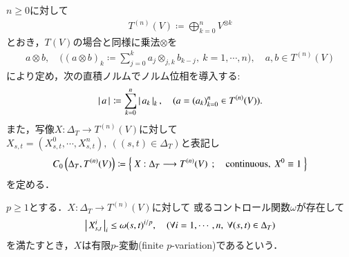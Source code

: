 	$n \geq 0$に対して
	\begin{align}
		T^{(n)}(V) \coloneqq \bigoplus_{k=0}^{n} V^{\otimes k}
	\end{align}
	とおき，$T(V)$の場合と同様に乗法$\otimes$を
	\begin{align}
		a \otimes b,\quad
		\Biggl((a \otimes b)_k \coloneqq \sum_{j=0}^{k} a_j \otimes_{j,k} b_{k-j},\ k=1,\cdots,n \Biggr),
		\quad a,b \in T^{(n)}(V)
	\end{align}
	により定め，次の直積ノルムでノルム位相を導入する:
	\begin{align}
		\left|\, a\, \right|_{} \coloneqq \sum_{k=0}^n \left|\, a_k\, \right|_{k},
		\quad (a = (a_k)_{k=0}^n \in T^{(n)}(V)).
		\label{eq:def_norm_on_truncated_tensor_algebra}
	\end{align}
	また，写像$X:\Delta_T \longrightarrow T^{(n)}(V)$に対して
	$X_{s,t} = (X^0_{s,t},\cdots,X^n_{s,t}),\ ((s,t) \in \Delta_T)$と表記し
	\begin{align}
		C_0 \left(\Delta_T,T^{(n)}(V) \right)
		\coloneqq \left\{\ X:\Delta_T \longrightarrow T^{(n)}(V)\ \, ; \quad \mbox{continuous},\ X^0 \equiv 1\ \right\}
	\end{align}
	を定める．
	
	\begin{screen}
		\begin{dfn}[有限$p$-変動]
			$p \geq 1$とする．$X:\Delta_T \longrightarrow T^{(n)}(V)$に対して
			或るコントロール関数$\omega$が存在して
			\begin{align}
				\left|\, X^i_{s,t}\, \right|_{i} \leq \omega(s,t)^{i/p},
				\quad (\forall i=1,\cdots,n,\ \forall (s,t) \in \Delta_T)
				\label{eq:def_finite_p_variation}
			\end{align}
			を満たすとき，$X$は有限$p$-変動(finite $p$-variation)であるという．\footnotemark
		\end{dfn}
	\end{screen}
	
